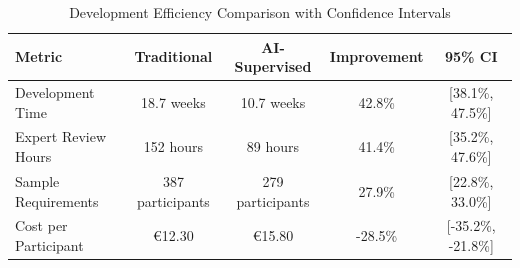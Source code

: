
\begin{table}[ht]
\centering
\caption{Development Efficiency Comparison with Confidence Intervals}
\label{tab:efficiency-comparison}
\begin{tabular}{lcccc}
\toprule
Metric & Traditional & AI-Supervised & Improvement & 95\% CI \\
\midrule
Development Time & 18.7 weeks & 10.7 weeks & 42.8\% & [38.1\%, 47.5\%] \\
Expert Review Hours & 152 hours & 89 hours & 41.4\% & [35.2\%, 47.6\%] \\
Sample Requirements & 387 participants & 279 participants & 27.9\% & [22.8\%, 33.0\%] \\
Cost per Participant & €12.30 & €15.80 & -28.5\% & [-35.2\%, -21.8\%] \\
\bottomrule
\end{tabular}
\end{table}
